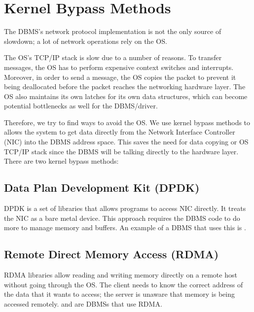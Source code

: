 \documentclass[11pt]{article}
\begin{document}
\section{Kernel Bypass Methods}
The DBMS's network protocol implementation is not the only source of slowdown; a lot of network operations rely on the OS. 

The OS's TCP/IP stack is slow due to a number of reasons. To transfer messages, the OS has to perform expensive context switches and interrupts. Moreover, in order to send a message, the OS copies the packet to prevent it being deallocated before the packet reaches the networking hardware layer. The OS also maintains its own latches for its own data structures, which can become potential bottlenecks as well for the DBMS/driver.

Therefore, we try to find ways to avoid the OS. We use kernel bypass methods to allows the system to get data directly from the Network Interface Controller (NIC) into the DBMS address space. This saves the need for data copying or OS TCP/IP stack since the DBMS will be talking directly to the hardware layer. There are two kernel bypass methods:

\subsection*{Data Plan Development Kit (DPDK)}
DPDK is a set of libraries that allows programs to access NIC directly. It treats the NIC as a bare metal device. This approach requires the DBMS code to do more to manage memory and buffers. An example of a DBMS that uses this is .

\subsection*{Remote Direct Memory Access (RDMA)}
RDMA libraries allow reading and writing memory directly on a remote host without going through the OS. The client needs to know the correct address of the data that it wants to access; the server is unaware that memory is being accessed remotely.  and  are DBMSs that use RDMA.

\newpage


\end{document}
